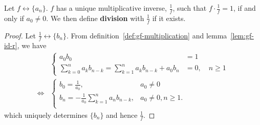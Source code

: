 \documentclass[a4paper, 12pt]{report}
\begin{document}
\begin{thm}\label{thm:gf-mult-inv}
Let $f \longleftrightarrow \{a_n\}$. $f$ has a unique multiplicative inverse, $\frac{1}{f}$, such that $f \cdot \frac{1}{f} = 1$, if and only if $a_0 \neq 0$. We then define \textbf{division} with $\frac{1}{f}$ if it exists.
\end{thm}
\begin{proof}
Let $\frac{1}{f} \longleftrightarrow \{b_n\}$. From definition~\ref{def:gf-multiplication} and lemma~\ref{lem:gf-id-r}, we have
\begin{align*}
    &\begin{cases}
        a_0 b_0 &= 1\\
        \sum_{k = 0}^n a_k b_{n - k} = \sum_{k = 1}^{n} a_k b_{n - k} + a_0 b_n &= 0, \quad n \geq 1
    \end{cases}\\
    \iff &\begin{cases}
        b_0 = \frac{1}{a_0}, &a_0 \neq 0\\
        b_n = -\frac{1}{a_0} \sum_{k = 1}^{n} a_n b_{n - k}, &a_0 \neq 0, n \geq 1.\\
    \end{cases}
\end{align*}
which uniquely determines $\{b_n\}$ and hence $\frac{1}{f}$.
\end{proof}
\end{document}
